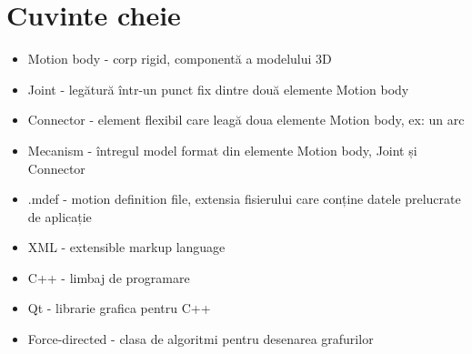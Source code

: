 \newpage
\section{Cuvinte cheie}
\begin{itemize}
    \item Motion body - corp rigid, componentă a modelului 3D
    \item Joint - legătură într-un punct fix dintre două elemente Motion body
    \item Connector - element flexibil care leagă doua elemente Motion body, ex: un arc
    \item Mecanism - întregul model format din elemente Motion body, Joint și Connector
    \item .mdef - motion definition file, extensia fisierului care conține datele prelucrate de aplicație
    \item XML - extensible markup language
    \item C++ - limbaj de programare
    \item Qt - librarie grafica pentru C++
    \item Force-directed - clasa de algoritmi pentru desenarea grafurilor
\end{itemize}


